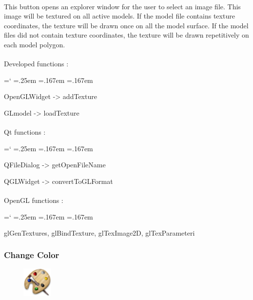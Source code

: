 \documentclass[12pt]{report}
\DeclareRobustCommand*{\ttfamily}{
  \origttfamily
  \hyphenchar\font=`\-\relax
  \fontdimen3\font=.25em\relax
  \fontdimen4\font=.167em\relax
  \fontdimen7\font=.167em\relax
}
\newenvironment{code}{\ttfamily}{}
\begin{document}
\paragraph{}
	This button opens an explorer window for the user to select an image file. This image will be textured on all active models. If the model file contains texture coordinates, the texture will be drawn once on all the model surface. If the model files did not contain texture coordinates, the texture will be drawn repetitively on each model polygon.

\paragraph{}
	Developed functions :

	\begin{code}
	OpenGLWidget -> addTexture

	GLmodel -> loadTexture
	\end{code}

\paragraph{}
	Qt functions :

	\begin{code}
	QFileDialog -> getOpenFileName

	QGLWidget -> convertToGLFormat
	\end{code}

\paragraph{}
	OpenGL functions :

	\begin{code}
	glGenTextures, glBindTexture, glTexImage2D, glTexParameteri
	\end{code}



\subsubsection{Change Color}

\begin{figure}
\vspace{-20pt}
\includegraphics[width=1.5cm]{icons/color.png}
\end{figure}
\end{document}

